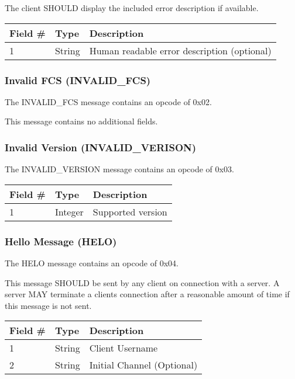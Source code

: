 \documentclass[12pt]{article}
\begin{document}
The client SHOULD display the included error description if available.

\begin{table}[ht]
\begin{tabular} {|l|l|l|}
    \hline 
    Field \# & Type & Description \\
    \hline
    1 & String & Human readable error description (optional) \\
    \hline
\end{tabular}
\end{table}

\subsubsection{Invalid FCS (INVALID\_FCS)}
The INVALID\_FCS message contains an opcode of 0x02.

This message contains no additional fields.

\subsubsection{Invalid Version (INVALID\_VERISON)}
The INVALID\_VERSION message contains an opcode of 0x03.

\begin{table}[ht]
\begin{tabular} {|l|l|l|}
    \hline 
    Field \# & Type & Description \\
    \hline
    1 & Integer & Supported version \\
    \hline
\end{tabular}
\end{table}

\subsubsection{Hello Message (HELO)}
The HELO message contains an opcode of 0x04.

This message SHOULD be sent by any client on connection with a server. A server
MAY terminate a clients connection after a reasonable amount of time if this
message is not sent.

\begin{table}[ht]
\begin{tabular} {|l|l|l|}
    \hline 
    Field \# & Type & Description \\
    \hline
    1 & String & Client Username \\
    2 & String & Initial Channel (Optional) \\
    \hline
\end{tabular}
\end{table}
\end{document}
